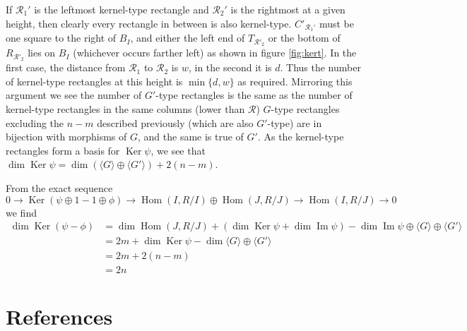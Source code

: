 \documentclass[a4page]{article}
\def\Ker{\operatorname{Ker}}
\def\Hom{\operatorname{Hom}}
\theoremstyle{definition}
\newcommand{\R}{\mathcal{R}}
\DeclareMathOperator{\im}{Im}
\begin{document}
If $\R_1'$ is the leftmost kernel-type rectangle and $\R_2'$ is the rightmost at a given height, then clearly every rectangle in between is also kernel-type.
$C'_{\R_1'}$ must be one square to the right of $B_I$, and either the left end of $T_{\R'_2}$ or the bottom of $R_{\R'_2}$ lies on $B_I$ (whichever occurs farther left) as shown in figure \ref{fig:kert}.
In the first case, the distance from $\R_1$ to $\R_2$ is $w$, in the second it is $d$.
Thus the number of kernel-type rectangles at this height is $\min \{d,w\}$ as required.
Mirroring this argument we see the number of $G'$-type rectangles is the same as the number of kernel-type rectangles in the same columns (lower than $\R$)
$G$-type rectangles excluding the $n-m$ described previously (which are also $G'$-type) are in bijection with morphisms of $G$, and the same is true of $G'$.
As the kernel-type rectangles form a basis for $\Ker \psi$, we see that $\dim \Ker \psi = \dim \left(\langle G \rangle \oplus \langle G' \rangle\right)+2(n-m)$.

From the exact sequence 
\[0 \to \Ker (\psi \oplus 1 - 1 \oplus \phi) \to \Hom(I,R/I)\oplus \Hom(J,R/J) \to \Hom(I,R/J) \to 0\]
we find 
\begin{align*}
\dim \Ker (\psi- \phi) &= \dim \Hom(J,R/J) + (\dim \Ker \psi + \dim \im \psi) - \dim \im \psi \oplus \langle G \rangle \oplus \langle G' \rangle\\
&= 2m + \dim \Ker \psi - \dim \langle G \rangle \oplus \langle G' \rangle\\
&= 2m + 2(n-m)\\
&= 2n
\end{align*}

\newpage

\section{References}

\end{document}
